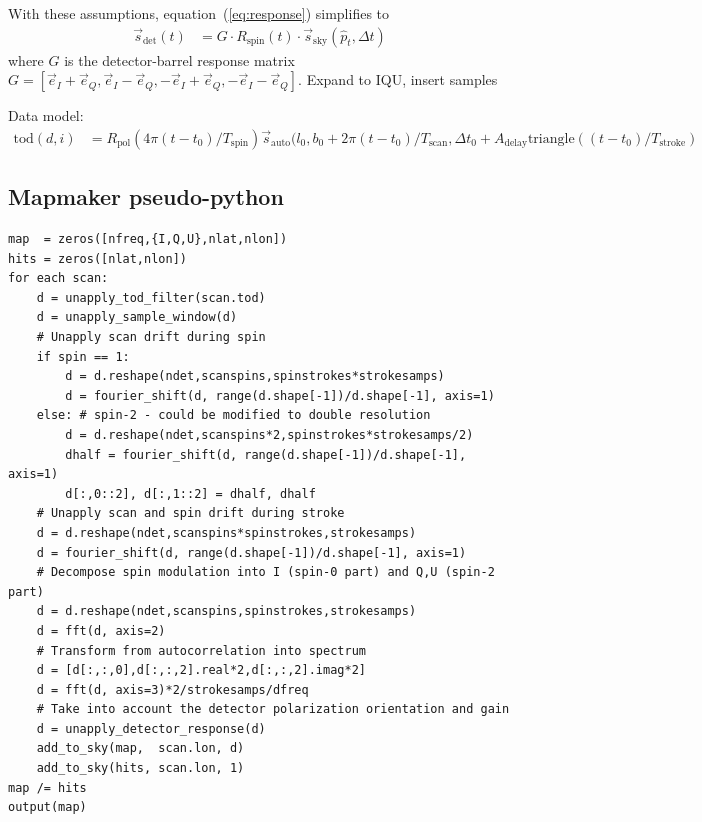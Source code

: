 \documentclass{article}
\begin{document}
With these assumptions, equation~(\ref{eq:response}) simplifies to
\begin{align}
	\vec s_\textrm{det}(t) &=
		G \cdot R_\textrm{spin}(t)\cdot\vec s_\textrm{sky}(\hat p_t,\Delta t)
\end{align}
where $G$ is the detector-barrel response matrix
$G = [\vec e_I+\vec e_Q,\vec e_I-\vec e_Q,-\vec e_I+\vec e_Q,
-\vec e_I-\vec e_Q]$. {\color{red}Expand to IQU, insert samples}


Data model:
\begin{align}
	\textrm{tod}(d,i) &= R_\textrm{pol}(4 \pi (t-t_0)/T_\textrm{spin})
		\vec s_\textrm{auto}(l_0,b_0 + 2\pi (t-t_0) / T_\textrm{scan},
		\Delta t_0 + A_\textrm{delay} \textrm{triangle}((t-t_0)/T_\textrm{stroke})
\end{align}

\subsection{Mapmaker pseudo-python}
\begin{lstlisting}
map  = zeros([nfreq,{I,Q,U},nlat,nlon])
hits = zeros([nlat,nlon])
for each scan:
	d = unapply_tod_filter(scan.tod)
	d = unapply_sample_window(d)
	# Unapply scan drift during spin
	if spin == 1:
		d = d.reshape(ndet,scanspins,spinstrokes*strokesamps)
		d = fourier_shift(d, range(d.shape[-1])/d.shape[-1], axis=1)
	else: # spin-2 - could be modified to double resolution
		d = d.reshape(ndet,scanspins*2,spinstrokes*strokesamps/2)
		dhalf = fourier_shift(d, range(d.shape[-1])/d.shape[-1], axis=1)
		d[:,0::2], d[:,1::2] = dhalf, dhalf
	# Unapply scan and spin drift during stroke
	d = d.reshape(ndet,scanspins*spinstrokes,strokesamps)
	d = fourier_shift(d, range(d.shape[-1])/d.shape[-1], axis=1)
	# Decompose spin modulation into I (spin-0 part) and Q,U (spin-2 part)
	d = d.reshape(ndet,scanspins,spinstrokes,strokesamps)
	d = fft(d, axis=2)
	# Transform from autocorrelation into spectrum
	d = [d[:,:,0],d[:,:,2].real*2,d[:,:,2].imag*2]
	d = fft(d, axis=3)*2/strokesamps/dfreq
	# Take into account the detector polarization orientation and gain
	d = unapply_detector_response(d)
	add_to_sky(map,  scan.lon, d)
	add_to_sky(hits, scan.lon, 1)
map /= hits
output(map)
\end{lstlisting}
\end{document}
